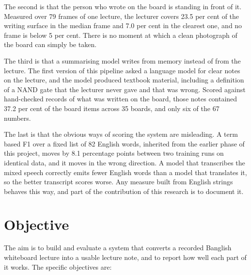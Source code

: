The second is that the person who wrote on the board is standing in front of it. Measured over 79 frames of
one lecture, the lecturer covers 23.5 per cent of the writing surface in the median frame
and 7.0 per cent in the clearest one, and no frame is below 5 per cent. There is no
moment at which a clean photograph of the board can simply be taken.

The third is that a summarising model writes from memory instead of from the
lecture. The first version of
this pipeline asked a language model for clear notes on the lecture, and the model
produced textbook material, including a definition of a NAND gate that the lecturer never
gave and that was wrong. Scored against hand-checked records of what was written on the
board, those notes contained 37.2 per cent of the board items across 35 boards, and only
six of the 67 numbers.

The last is that the obvious ways of scoring the system are misleading. A term based F1 over a fixed list
of 82 English words, inherited from the earlier phase of this project, moves by 8.1
percentage points between two training runs on identical data, and it moves in the wrong
direction. A model that transcribes the mixed speech correctly emits fewer English words
than a model that translates it, so the better transcript scores worse. Any measure built
from English strings behaves this way, and part of the contribution of this research is to
document it.

\section{Objective}

The aim is to build and evaluate a system that converts a recorded Banglish whiteboard
lecture into a usable lecture note, and to report how well each part of it works. The
specific objectives are:

